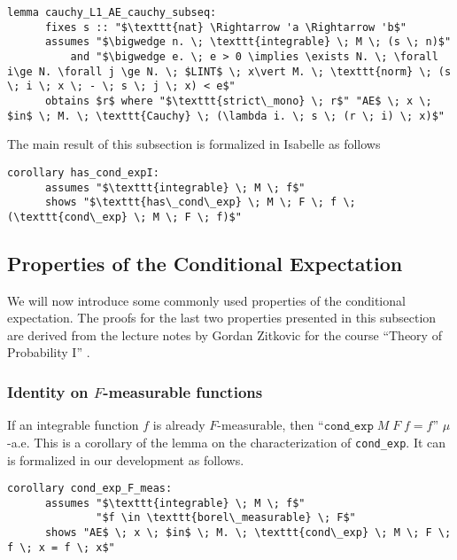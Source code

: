\begin{isalemma}
{\small
	\begin{lstlisting}[style=isabelle]
	lemma cauchy_L1_AE_cauchy_subseq:
	  fixes s :: "$\texttt{nat} \Rightarrow 'a \Rightarrow 'b$"
	  assumes "$\bigwedge n. \; \texttt{integrable} \; M \; (s \; n)$"
		  and "$\bigwedge e. \; e > 0 \implies \exists N. \; \forall i\ge N. \forall j \ge N. \; $LINT$ \; x\vert M. \; \texttt{norm} \; (s \; i \; x \; - \; s \; j \; x) < e$"
	  obtains $r$ where "$\texttt{strict\_mono} \; r$" "AE$ \; x \; $in$ \; M. \; \texttt{Cauchy} \; (\lambda i. \; s \; (r \; i) \; x)$"
	\end{lstlisting}
}
\end{isalemma}


The main result of this subsection is formalized in Isabelle as follows

\begin{isacorollary}
{\small
	\begin{lstlisting}[style=isabelle]
	corollary has_cond_expI:
	  assumes "$\texttt{integrable} \; M \; f$"
	  shows "$\texttt{has\_cond\_exp} \; M \; F \; f \; (\texttt{cond\_exp} \; M \; F \; f)$"
	\end{lstlisting}
}
\end{isacorollary}

\subsection{Properties of the Conditional Expectation}

We will now introduce some commonly used properties of the conditional expectation. The proofs for the last two properties presented in this subsection are derived from the lecture notes by Gordan Zitkovic for the course ``Theory of Probability I'' \cite{Zitkovic_2015}.

\subsubsection{Identity on $F$-measurable functions}

If an integrable function $f$ is already $F$-measurable, then ``$\texttt{cond\_exp} \; M \; F \; f = f$'' $\mu$-a.e. This is a corollary of the lemma on the characterization of \texttt{cond\_exp}. It can is formalized in our development as follows.
\begin{isacorollary}
{\small
	\begin{lstlisting}[style=isabelle]
	corollary cond_exp_F_meas:
	  assumes "$\texttt{integrable} \; M \; f$"
			  "$f \in \texttt{borel\_measurable} \; F$"
	  shows "AE$ \; x \; $in$ \; M. \; \texttt{cond\_exp} \; M \; F \; f \; x = f \; x$"
	\end{lstlisting}
}
\end{isacorollary}


